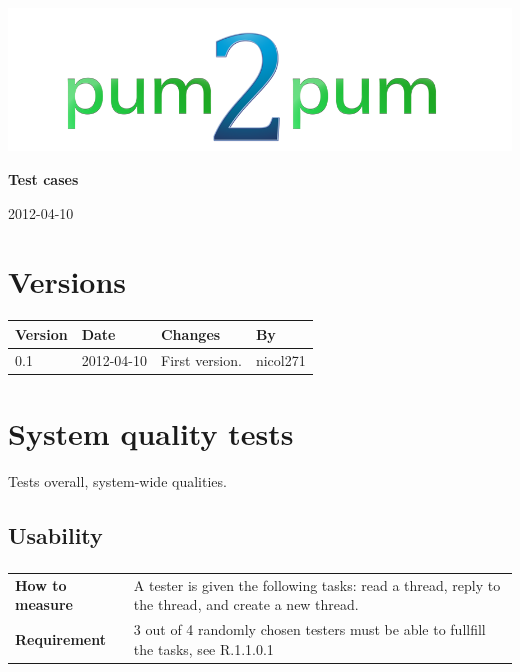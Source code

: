 \documentclass[a4paper, 12pt, titlepage]{article}
\newcommand{\urequirement}[2]{
	\subsubsection{}
	\begin{tabular}{l p{10cm}}
	\bf{How to measure} & 
		#1\\
	\bf{Requirement} & 
		#2\\
	\end{tabular}
}
\begin{document}
	
	\begin{titlepage}
		
		\includegraphics[scale=0.4]{logoNormal.png}
		
		\vspace{6cm}
		
		\begin{center}
			\Huge{\textbf{Test cases}} %
			
			\vspace{0.5cm}
			
			\huge{2012-04-10} %
		\end{center}
		
	\end{titlepage}
	
	\tableofcontents
	\newpage
	
	\section*{Versions}
	\begin{tabularx}{1\textwidth}{|l|l|X|l|}
		\hline
		\bf{Version} & \bf{Date} & \bf{Changes} & \bf{By} \\
		\hline
		0.1 & 2012-04-10 & First version. & nicol271 \\
		\hline
	\end{tabularx}
	\newpage
	
	\section{System quality tests}
	Tests overall, system-wide qualities.

	\subsection{Usability}
		\urequirement
		{
			A tester is given the following tasks: read a thread, reply to the thread, and create a new thread.
		}{
			3 out of 4 randomly chosen testers must be able to fullfill the tasks, see R.1.1.0.1
		}
\end{document}
